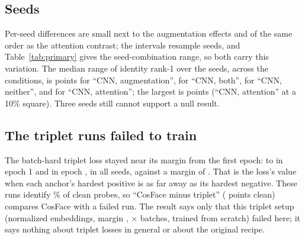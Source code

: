 \begin{table}[t]
\caption{Mean attention weight inside / outside the occluder, first  probes, mean of  seeds, no interval; seven of the  occluded conditions (all are in \texttt{eval/*/attention\_check.csv}). ``Triplet'' = the batch-hard triplet runs, which failed to train.}
\label{tab:attention}
\centering\small
\setlength{\tabcolsep}{4pt}

\end{table}

\subsection{Seeds}

Per-seed differences are small next to the augmentation effects and of the same order as the attention contrast; the intervals resample seeds, and Table~\ref{tab:primary} gives the seed-combination range, so both carry this variation. The median range of identity rank-1 over the  seeds, across the  conditions, is  points for ``CNN, augmentation'',  for ``CNN, both'',  for ``CNN, neither'', and  for ``CNN, attention''; the largest is  points (``CNN, attention'' at a 10\% square). Three seeds still cannot support a null result.

\subsection{The triplet runs failed to train}\label{sec:triplet}

The batch-hard triplet loss stayed near its margin from the first epoch:  to  in epoch 1 and  in epoch , in all  seeds, against a margin of . That is the loss's value when each anchor's hardest positive is as far away as its hardest negative. These runs identify \% of clean probes, so ``CosFace minus triplet'' ( points clean) compares CosFace with a failed run. The result says only that this triplet setup (normalized embeddings, margin , $\times$ batches, trained from scratch) failed here; it says nothing about triplet losses in general or about the original recipe.

